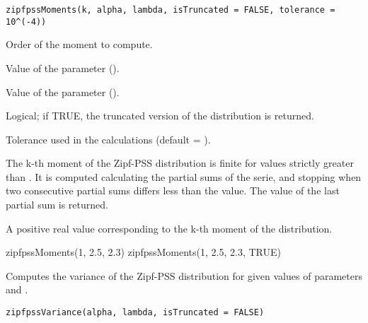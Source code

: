 \documentclass[letterpaper]{book}
\begin{document}
%
\begin{Usage}
\begin{verbatim}
zipfpssMoments(k, alpha, lambda, isTruncated = FALSE, tolerance = 10^(-4))
\end{verbatim}
\end{Usage}
%
\begin{Arguments}
\begin{ldescription}
\item[\code{k}] Order of the moment to compute.

\item[\code{alpha}] Value of the \eqn{\alpha}{} parameter ().

\item[\code{lambda}] Value of the \eqn{\lambda}{} parameter ().

\item[\code{isTruncated}] Logical; if TRUE, the truncated version of the distribution is returned.

\item[\code{tolerance}] Tolerance used in the calculations (default = ).
\end{ldescription}
\end{Arguments}
%
\begin{Details}\relax
The k-th moment of the Zipf-PSS distribution is finite for \eqn{\alpha}{} values
strictly greater than .
It is computed calculating the partial sums of the serie, and stopping when two
consecutive partial sums differs less than the  value.
The value of the last partial sum is returned.
\end{Details}
%
\begin{Value}
A positive real value corresponding to the k-th moment of the distribution.
\end{Value}
%
\begin{Examples}
\begin{ExampleCode}
zipfpssMoments(1, 2.5, 2.3)
zipfpssMoments(1, 2.5, 2.3, TRUE)
\end{ExampleCode}
\end{Examples}
%
\begin{Description}\relax
Computes the variance of the Zipf-PSS distribution for given values of parameters
\eqn{\alpha}{} and \eqn{\lambda}{}.
\end{Description}
%
\begin{Usage}
\begin{verbatim}
zipfpssVariance(alpha, lambda, isTruncated = FALSE)
\end{verbatim}
\end{Usage}
\end{document}
